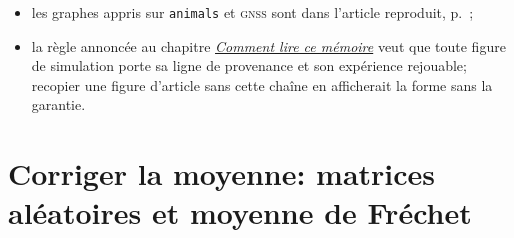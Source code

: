 
\begin{remark}
\label{rem:learning-pas-de-figure}
  \begin{itemize}
    \item les graphes appris sur \texttt{animals} et \textsc{gnss} sont dans
      l'article reproduit, p.~;
    \item la règle annoncée au chapitre
      \hyperref[ch:commentlire]{\emph{Comment lire ce mémoire}} veut que toute
      figure de simulation porte sa ligne de provenance et son expérience
      rejouable; recopier une figure d'article sans cette chaîne en afficherait
      la forme sans la garantie.
  \end{itemize}
  \leavevmode
\end{remark}

\section{Corriger la moyenne: matrices aléatoires et moyenne de Fréchet}
\label{sec:learning-frechet}

